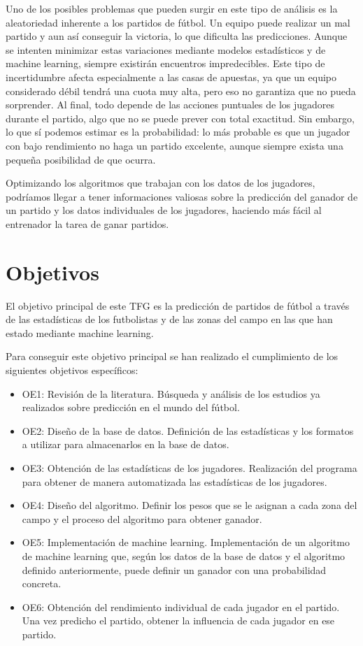 Uno de los posibles problemas que pueden surgir en este tipo de análisis es la aleatoriedad inherente a los partidos de fútbol. Un equipo puede realizar un mal partido y aun así conseguir la victoria, lo que dificulta las predicciones. Aunque se intenten minimizar estas variaciones mediante modelos estadísticos y de machine learning, siempre existirán encuentros impredecibles. Este tipo de incertidumbre afecta especialmente a las casas de apuestas, ya que un equipo considerado débil tendrá una cuota muy alta, pero eso no garantiza que no pueda sorprender. Al final, todo depende de las acciones puntuales de los jugadores durante el partido, algo que no se puede prever con total exactitud. Sin embargo, lo que sí podemos estimar es la probabilidad: lo más probable es que un jugador con bajo rendimiento no haga un partido excelente, aunque siempre exista una pequeña posibilidad de que ocurra.

Optimizando los algoritmos que trabajan con los datos de los jugadores, podríamos llegar a tener informaciones valiosas sobre la predicción del ganador de un partido y los datos individuales de los jugadores, haciendo más fácil al entrenador la tarea de ganar partidos.

\section{Objetivos}
El objetivo principal de este TFG es la predicción de partidos de fútbol a través de las estadísticas de los futbolistas y de las zonas del campo en las que han estado mediante machine learning.

Para conseguir este objetivo principal se han realizado el cumplimiento de los siguientes objetivos específicos:
\begin{itemize}
    \item OE1: Revisión de la literatura. Búsqueda y análisis de los estudios ya realizados sobre predicción en el mundo del fútbol.
    \item OE2: Diseño de la base de datos. Definición de las estadísticas y los formatos a utilizar para almacenarlos en la base de datos.
    \item OE3: Obtención de las estadísticas de los jugadores. Realización del programa para obtener de manera automatizada las estadísticas de los jugadores.
    \item OE4: Diseño del algoritmo. Definir los pesos que se le asignan a cada zona del campo y el proceso del algoritmo para obtener ganador.
    \item OE5: Implementación de machine learning. Implementación de un algoritmo de machine learning que, según los datos de la base de datos y el algoritmo definido anteriormente, puede definir un ganador con una probabilidad concreta. 
    \item OE6: Obtención del rendimiento individual de cada jugador en el partido. Una vez predicho el partido, obtener la influencia de cada jugador en ese partido.
    
\end{itemize}
